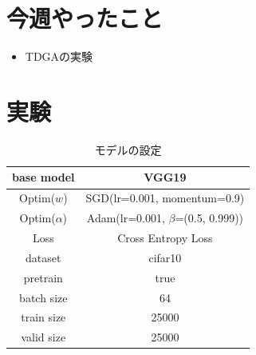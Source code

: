 \documentclass[twocolumn]{jarticle}     %
\begin{document}


\section{今週やったこと}
\begin{itemize}
  \item TDGAの実験
\end{itemize}


\section{実験}

\begin{table}[tb]
  \begin{center}
    \caption{モデルの設定}
    \begin{tabular}{|c|c|} \hline
      base model & VGG19 \\ \hline
      Optim($w$) & SGD(lr=0.001, momentum=0.9) \\ \hline
      Optim($\alpha$) & Adam(lr=0.001, $\beta$=(0.5, 0.999)) \\ \hline
      Loss & Cross Entropy Loss \\ \hline
      dataset & cifar10 \\ \hline
      pretrain & true \\ \hline
      batch size & 64 \\ \hline
      train size & 25000 \\ \hline
      valid size & 25000 \\ \hline
    \end{tabular}
    \label{tab:setting}
  \end{center}
\end{table}
\end{document}

